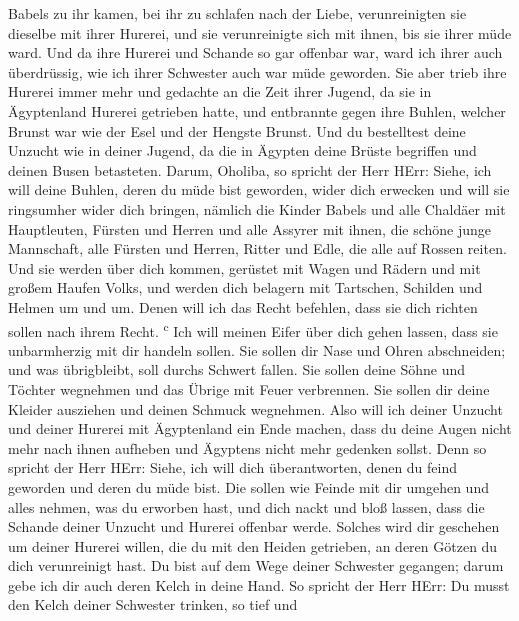 Babels zu ihr kamen, bei ihr zu schlafen nach der Liebe, verunreinigten
sie dieselbe mit ihrer Hurerei, und sie verunreinigte sich mit ihnen,
bis sie ihrer müde ward.  Und da ihre Hurerei und Schande
so gar offenbar war, ward ich ihrer auch überdrüssig, wie ich ihrer
Schwester auch war müde geworden.  Sie aber trieb ihre
Hurerei immer mehr und gedachte an die Zeit ihrer Jugend, da sie in
Ägyptenland Hurerei getrieben hatte,  und entbrannte
gegen ihre Buhlen, welcher Brunst war wie der Esel und der Hengste
Brunst.  Und du bestelltest deine Unzucht wie in deiner
Jugend, da die in Ägypten deine Brüste begriffen und deinen Busen
betasteten.  Darum, Oholiba, so spricht der Herr HErr:
Siehe, ich will deine Buhlen, deren du müde bist geworden, wider dich
erwecken und will sie ringsumher wider dich bringen, 
nämlich die Kinder Babels und alle Chaldäer mit Hauptleuten, Fürsten und
Herren und alle Assyrer mit ihnen, die schöne junge Mannschaft, alle
Fürsten und Herren, Ritter und Edle, die alle auf Rossen reiten.
 Und sie werden über dich kommen, gerüstet mit Wagen und
Rädern und mit großem Haufen Volks, und werden dich belagern mit
Tartschen, Schilden und Helmen um und um. Denen will ich das Recht
befehlen, dass sie dich richten sollen nach ihrem Recht.
\textsuperscript{c}  Ich will meinen Eifer über dich
gehen lassen, dass sie unbarmherzig mit dir handeln sollen. Sie sollen
dir Nase und Ohren abschneiden; und was übrigbleibt, soll durchs Schwert
fallen. Sie sollen deine Söhne und Töchter wegnehmen und das Übrige mit
Feuer verbrennen.  Sie sollen dir deine Kleider ausziehen
und deinen Schmuck wegnehmen.  Also will ich deiner
Unzucht und deiner Hurerei mit Ägyptenland ein Ende machen, dass du
deine Augen nicht mehr nach ihnen aufheben und Ägyptens nicht mehr
gedenken sollst.  Denn so spricht der Herr HErr: Siehe,
ich will dich überantworten, denen du feind geworden und deren du müde
bist.  Die sollen wie Feinde mit dir umgehen und alles
nehmen, was du erworben hast, und dich nackt und bloß lassen, dass die
Schande deiner Unzucht und Hurerei offenbar werde. 
Solches wird dir geschehen um deiner Hurerei willen, die du mit den
Heiden getrieben, an deren Götzen du dich verunreinigt hast.
 Du bist auf dem Wege deiner Schwester gegangen; darum
gebe ich dir auch deren Kelch in deine Hand.  So spricht
der Herr HErr: Du musst den Kelch deiner Schwester trinken, so tief und
